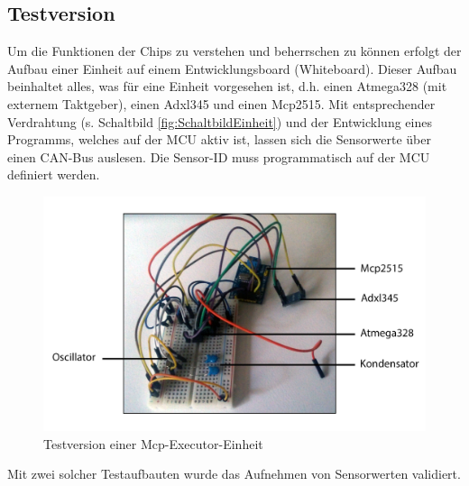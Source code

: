 \subsection{Testversion}
\label{kap:McpExecutorTestversion}
Um die Funktionen der Chips zu verstehen und beherrschen zu können erfolgt der Aufbau einer Einheit auf einem Entwicklungsboard (Whiteboard). Dieser Aufbau beinhaltet alles, was für eine Einheit vorgesehen ist, d.h. einen Atmega328 (mit externem Taktgeber), einen Adxl345 und einen Mcp2515. Mit entsprechender Verdrahtung (s. Schaltbild \ref{fig:SchaltbildEinheit}) und der Entwicklung eines Programms, welches auf der MCU aktiv ist, lassen sich die Sensorwerte über einen CAN-Bus auslesen. Die Sensor-ID muss programmatisch auf der MCU definiert werden. 

\begin{figure}[H]
	\centering
	\includegraphics[width=0.9\linewidth]{Bilder/McpExecutorTest}
	\caption[Testversion einer Mcp-Executor-Einheit]{Testversion einer Mcp-Executor-Einheit}
	\label{fig:McpExecutorTest}
\end{figure}

Mit zwei solcher Testaufbauten wurde das Aufnehmen von Sensorwerten validiert.